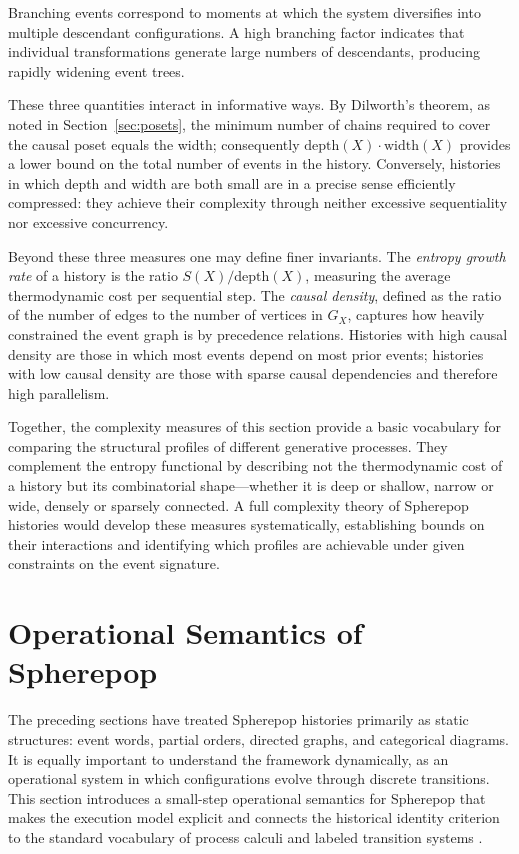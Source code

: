 \documentclass[12pt]{article}
\theoremstyle{plain}
\theoremstyle{definition}
\theoremstyle{remark}
\begin{document}
Branching events correspond to moments at which the system diversifies into
multiple descendant configurations.  A high branching factor indicates that
individual transformations generate large numbers of descendants, producing
rapidly widening event trees.

These three quantities interact in informative ways.  By Dilworth's theorem,
as noted in Section~\ref{sec:posets}, the minimum number of chains required to
cover the causal poset equals the width; consequently $\mathrm{depth}(X)
\cdot \mathrm{width}(X)$ provides a lower bound on the total number of events
in the history.  Conversely, histories in which depth and width are both small
are in a precise sense efficiently compressed: they achieve their complexity
through neither excessive sequentiality nor excessive concurrency.

Beyond these three measures one may define finer invariants.  The
\emph{entropy growth rate} of a history is the ratio $S(X) / \mathrm{depth}(X)$,
measuring the average thermodynamic cost per sequential step.  The
\emph{causal density}, defined as the ratio of the number of edges to the
number of vertices in $G_X$, captures how heavily constrained the event graph
is by precedence relations.  Histories with high causal density are those in
which most events depend on most prior events; histories with low causal density
are those with sparse causal dependencies and therefore high parallelism.

Together, the complexity measures of this section provide a basic vocabulary
for comparing the structural profiles of different generative processes.  They
complement the entropy functional by describing not the thermodynamic cost of
a history but its combinatorial shape---whether it is deep or shallow, narrow
or wide, densely or sparsely connected.  A full complexity theory of Spherepop
histories would develop these measures systematically, establishing bounds on
their interactions and identifying which profiles are achievable under given
constraints on the event signature.


\section{Operational Semantics of Spherepop}
\label{sec:operational}

The preceding sections have treated Spherepop histories primarily as static
structures: event words, partial orders, directed graphs, and categorical
diagrams.  It is equally important to understand the framework dynamically, as
an operational system in which configurations evolve through discrete
transitions.  This section introduces a small-step operational semantics for
Spherepop that makes the execution model explicit and connects the historical
identity criterion to the standard vocabulary of process calculi and labeled
transition systems \citep{Abramsky1994}.
\end{document}
